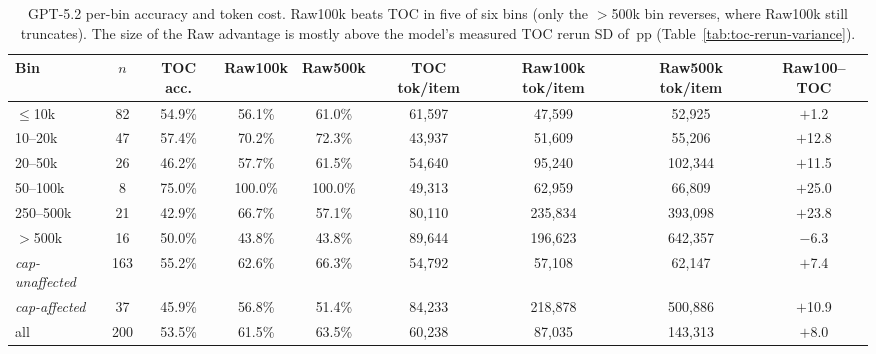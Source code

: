 \documentclass{article}
\begin{document}
\begin{table}[h]
\centering
\scriptsize
\setlength{\tabcolsep}{4pt}
\begin{tabular}{lcccccccc}
\toprule
Bin & $n$ & TOC acc. & Raw100k & Raw500k & TOC tok/item & Raw100k tok/item & Raw500k tok/item & Raw100--TOC \\
\midrule
$\le$10k & 82 & 54.9\% & 56.1\% & 61.0\% & 61{,}597 & 47{,}599 & 52{,}925 & $+$1.2 \\
10--20k & 47 & 57.4\% & 70.2\% & 72.3\% & 43{,}937 & 51{,}609 & 55{,}206 & $+$12.8 \\
20--50k & 26 & 46.2\% & 57.7\% & 61.5\% & 54{,}640 & 95{,}240 & 102{,}344 & $+$11.5 \\
50--100k & 8 & 75.0\% & 100.0\% & 100.0\% & 49{,}313 & 62{,}959 & 66{,}809 & $+$25.0 \\
250--500k & 21 & 42.9\% & 66.7\% & 57.1\% & 80{,}110 & 235{,}834 & 393{,}098 & $+$23.8 \\
$>$500k & 16 & 50.0\% & 43.8\% & 43.8\% & 89{,}644 & 196{,}623 & 642{,}357 & $-$6.3 \\
\midrule
\textit{cap-unaffected} & 163 & 55.2\% & 62.6\% & 66.3\% & 54{,}792 & 57{,}108 & 62{,}147 & $+$7.4 \\
\textit{cap-affected} & 37 & 45.9\% & 56.8\% & 51.4\% & 84{,}233 & 218{,}878 & 500{,}886 & $+$10.9 \\
all & 200 & 53.5\% & 61.5\% & 63.5\% & 60{,}238 & 87{,}035 & 143{,}313 & $+$8.0 \\
\bottomrule
\end{tabular}
\caption{GPT-5.2 per-bin accuracy and token cost. Raw100k beats TOC in five of six bins (only the $>$500k bin reverses, where Raw100k still truncates). The size of the Raw advantage is mostly above the model's measured TOC rerun SD of \GPTFiveTwoTOCRerunSD\,pp (Table~\ref{tab:toc-rerun-variance}).}
\label{tab:appendix-bin-gpt52}
\end{table}
\end{document}
